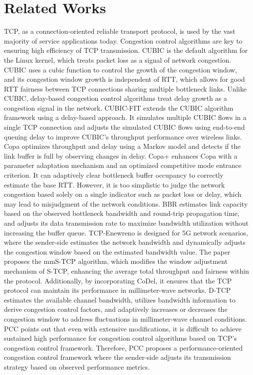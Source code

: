 \section{Related Works}
TCP, as a connection-oriented reliable transport protocol, is used by the vast majority of service applications today. Congestion control algorithms are key to ensuring high efficiency of TCP transmission. CUBIC is the default algorithm for the Linux kernel, which treats packet loss as a signal of network congestion. CUBIC uses a cubic function to control the growth of the congestion window, and its congestion window growth is independent of RTT, which allows for good RTT fairness between TCP connections sharing multiple bottleneck links. Unlike CUBIC, delay-based congestion control algorithms treat delay growth as a congestion signal in the network. CUBIC-FIT\cite{a21:J} extends the CUBIC algorithm framework using a delay-based approach. It simulates multiple CUBIC flows in a single TCP connection and adjusts the simulated CUBIC flows using end-to-end queuing delay to improve CUBIC's throughput performance over wireless links. Copa\cite{a23:V} optimizes throughput and delay using a Markov model and detects if the link buffer is full by observing changes in delay. Copa+\cite{a24:W} enhances Copa with a parameter adaptation mechanism and an optimized competitive mode entrance criterion. It can adaptively clear bottleneck buffer occupancy to correctly estimate the base RTT. However, it is too simplistic to judge the network congestion based solely on a single indicator such as packet loss or delay, which may lead to misjudgment of the network conditions. BBR estimates link capacity based on the observed bottleneck bandwidth and round-trip propagation time, and adjusts its data transmission rate to maximize bandwidth utilization without increasing the buffer queue. TCP-Enewreno\cite{a54:M} is designed for 5G network scenarios, where the sender-side estimates the network bandwidth and dynamically adjusts the congestion window based on the estimated bandwidth value. The paper\cite{a57:K} proposes the mmS-TCP algorithm, which modifies the window adjustment mechanism of S-TCP\cite{a58:K}, enhancing the average total throughput and fairness within the protocol. Additionally, by incorporating CoDel\cite{a59:K}, it ensures that the TCP protocol can maintain its performance in millimeter-wave networks. D-TCP\cite{a60:M} estimates the available channel bandwidth, utilizes bandwidth information to derive congestion control factors, and adaptively increases or decreases the congestion window to address fluctuations in millimeter-wave channel conditions. PCC\cite{a37:M} points out that even with extensive modifications, it is difficult to achieve sustained high performance for congestion control algorithms based on TCP's congestion control framework. Therefore, PCC proposes a performance-oriented congestion control framework where the sender-side adjusts its transmission strategy based on observed performance metrics.

